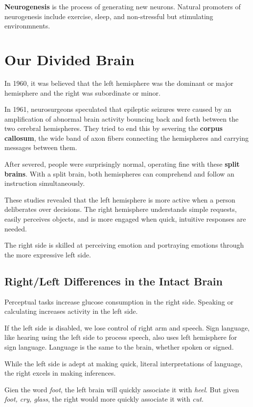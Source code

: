 \documentclass[12pt]{article}
\begin{document}
\textbf{Neurogenesis} is the process of generating new neurons. Natural promoters of neurogenesis include exercise, sleep, and non-stressful but stimulating environmnents.

\section*{Our Divided Brain}
In 1960, it was believed that the left hemisphere was the dominant or major hemisphere and the right was subordinate or minor. 

In 1961, neurosurgeons speculated that epileptic seizures were caused by an amplification of abnormal brain activity bouncing back and forth between the two cerebral hemispheres. They tried to end this by severing the \textbf{corpus callosum}, the wide band of axon fibers connecting the hemispheres and carrying messages between them.

After severed, people were surprisingly normal, operating fine with these \textbf{split brains}. With a split brain, both hemispheres can comprehend and follow an instruction simultaneously.

These studies revealed that the left hemisphere is more active when a person deliberates over decisions. The right hemisphere understands simple requests, easily perceives objects, and is more engaged when quick, intuitive responses are needed.

The right side is skilled at perceiving emotion and portraying emotions through the more expressive left side.

\subsection*{Right/Left Differences in the Intact Brain}
Perceptual tasks increase glucose consumption in the right side. Speaking or calculating increases activity in the left side.

If the left side is disabled, we lose control of right arm and speech. Sign language, like hearing using the left side to process speech, also uses left hemisphere for sign language. Language is the same to the brain, whether spoken or signed.

While the left side is adept at making quick, literal interpretations of language, the right excels in making inferences. 

Gien the word {\it foot}, the left brain will quickly associate it with {\it heel}. But given {\it foot, cry, glass}, the right would more quickly associate it with {\it cut}.
\end{document}
